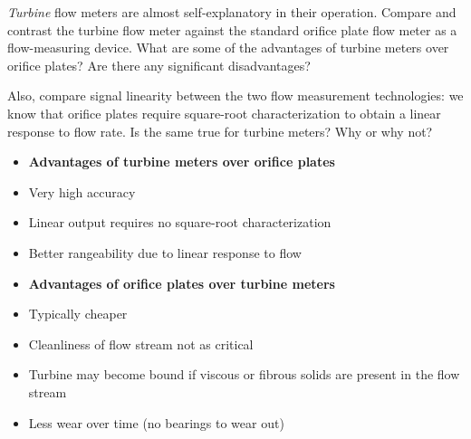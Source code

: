 

{\it Turbine} flow meters are almost self-explanatory in their operation.  Compare and contrast the turbine flow meter against the standard orifice plate flow meter as a flow-measuring device.  What are some of the advantages of turbine meters over orifice plates?  Are there any significant disadvantages?  

Also, compare signal linearity between the two flow measurement technologies: we know that orifice plates require square-root characterization to obtain a linear response to flow rate.  Is the same true for turbine meters?  Why or why not?







\begin{itemize}
\item{} {\bf Advantages of turbine meters over orifice plates}
\item{} Very high accuracy
\item{} Linear output requires no square-root characterization
\item{} Better rangeability due to linear response to flow
\end{itemize}

\begin{itemize}
\item{} {\bf Advantages of orifice plates over turbine meters}
\item{} Typically cheaper
\item{} Cleanliness of flow stream not as critical
\item{} Turbine may become bound if viscous or fibrous solids are present in the flow stream
\item{} Less wear over time (no bearings to wear out)
\end{itemize}











